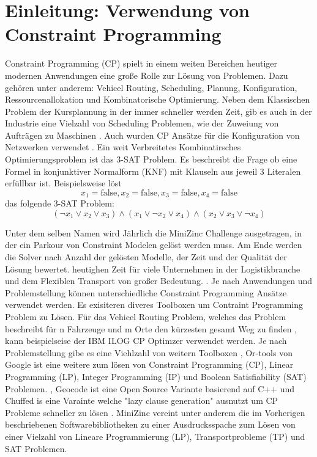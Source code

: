 




\tableofcontents

\clearpage
{}


\section{Einleitung: Verwendung von Constraint Programming}
\label{sec:Einleitung: Verwendung von Constraint Programming}
Constraint Programming (CP) spielt in einem weiten Bereichen heutiger modernen
Anwendungen eine große Rolle zur Lösung von Problemen. Dazu gehören unter
anderem: Vehicel Routing, Scheduling, Planung, Konfiguration,
Ressourcenallokation und Kombinatorische Optimierung. Neben dem Klassischen
Problem der Kursplannung \cite{duboi96jo} in der immer schneller werden Zeit,
gib es auch in der Industrie eine Vielzahl von Scheduling Problemen, wie der
Zuweiung von Aufträgen zu Maschinen \cite{gedik16jo}. Auch wurden CP Ansätze für
die Konfiguration von Netzwerken verwendet \cite{ardisjo}. Ein weit Verbreitetes
Kombinatirsches Optimierungsproblem ist das 3-SAT Problem. Es beschreibt die
Frage ob eine Formel in konjunktiver Normalform (KNF) mit Klauseln aus jeweil 3
Literalen erfüllbar ist.
Beispielsweise löst
$$x_1=\mathrm{false},x_2=\mathrm{false},x_3=\mathrm{false},x_4=\mathrm{false}$$
das folgende 3-SAT Problem: 
$$(\lnot x_1\lor x_2\lor x_3)\land(x_1\lor\lnot x_2\lor x_4)\land(x_2\lor x_3\lor\lnot x_4)$$

Unter dem selben Namen wird Jährlich die MiniZinc Challenge ausgetragen, in der
ein Parkour von Constraint Modelen gelöst werden muss. Am Ende werden die Solver
nach Anzahl der gelösten Modelle, der Zeit und der Qualität der Lösung bewertet.
heutighen Zeit für viele Unternehmen in der Logistikbranche und dem Flexiblen
Transport von großer Bedeutung. \cite[1]{delec22jo}. Je nach Anwendungen und
Problemstellung können unterschiedliche Constraint Programming Ansätze verwendet
werden. Es exisiteren diveres Toolboxen um Contraint Programming Problem zu
Lösen. Für das Vehicel Routing Problem, welches das Problem beschreibt für n
Fahrzeuge und m Orte den kürzesten gesamt Weg zu finden \cite[222]{labor18joa},
kann beispielseise der IBM ILOG CP Optimzer verwendet werden.\cite{IBMIwe} Je
nach Problemstellung gibe es eine Viehlzahl von weitern Toolboxen
\cite{Solviwea}, Or-tools von Google ist eine weitere zum lösen von Constraint
Programming (CP), Linear Programming (LP), Integer Programming (IP) und Boolean
Satisfiability (SAT) Problemen. \cite{ORToowe}, Geocode ist eine Open Source
Variante basierend auf C++ \cite{GECODwe} und Chuffed is eine Varainte welche
"lazy clause generation" ausnutzt um CP Probleme schneller zu lösen
\cite{Chuff24co}. MiniZinc vereint unter anderem die im Vorherigen beschriebenen
Softwarebibliotheken zu einer Ausdrucksspache zum Lösen von einer Vielzahl von
Lineare Programmierung (LP), Transportprobleme (TP) und SAT Problemen.
\cite{MiniZwe}


